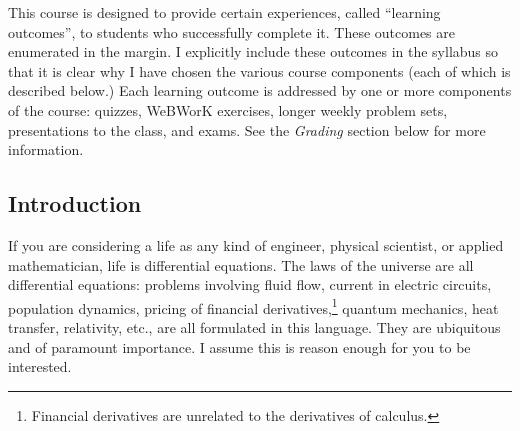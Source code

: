 \documentclass[symmetric]{tufte-handout}
\begin{document}
    This course is designed to provide certain experiences, called “learning
    outcomes”, to students who successfully complete it. These outcomes are
    enumerated in the margin.%
    I explicitly include these outcomes in the syllabus so that it is clear
    why I have chosen the various course components (each of which is
    described below.) Each learning outcome is addressed by one or more
    components of the course: quizzes, WeBWorK exercises, longer weekly problem sets,
    presentations to the class, and exams.
    See the \emph{Grading} section below for more information.

\subsection{Introduction}

If you are considering a life as any kind of engineer, physical scientist, or
applied mathematician, life is differential equations. The laws of the
universe are all differential equations: problems involving fluid flow,
current in electric circuits, population dynamics, pricing of financial
derivatives,\footnote{Financial derivatives are unrelated to the derivatives of
calculus.} quantum mechanics, heat transfer, relativity, etc., are all
formulated in this language. They are ubiquitous and of paramount importance.
I assume this is reason enough for you to be interested.
\end{document}
